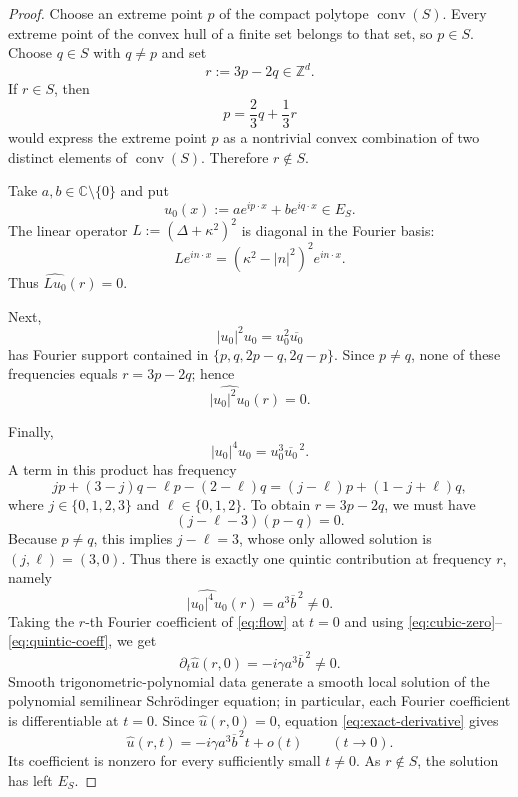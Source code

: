 \documentclass[11pt]{amsart}
\newcommand{\Z}{\mathbb Z}
\newcommand{\C}{\mathbb C}
\newcommand{\conv}{\operatorname{conv}}
\begin{document}
\begin{proof}
Choose an extreme point $p$ of the compact polytope $\conv(S)$.
Every extreme point of the convex hull of a finite set belongs to that set,
so $p\in S$.  Choose $q\in S$ with $q\ne p$ and set
\begin{equation}\label{eq:r}
 r:=3p-2q\in\Z^d.
\end{equation}
If $r\in S$, then
\[
 p=\frac23q+\frac13r
\]
would express the extreme point $p$ as a nontrivial convex combination
of two distinct elements of $\conv(S)$.  Therefore $r\notin S$.

Take $a,b\in\C\setminus\{0\}$ and put
\begin{equation}\label{eq:two-mode}
 u_0(x):=a e^{ip\cdot x}+b e^{iq\cdot x}\in E_S.
\end{equation}
The linear operator $L:=(\Delta+\kappa^2)^2$ is diagonal in the
Fourier basis:
\[
 L e^{in\cdot x}=(\kappa^2-|n|^2)^2e^{in\cdot x}.
\]
Thus $\widehat{Lu_0}(r)=0$.

Next,
\[
 |u_0|^2u_0=u_0^2\overline{u_0}
\]
has Fourier support contained in
$\{p,q,2p-q,2q-p\}$.  Since $p\ne q$, none of these
frequencies equals $r=3p-2q$; hence
\begin{equation}\label{eq:cubic-zero}
 \widehat{|u_0|^2u_0}(r)=0.
\end{equation}

Finally,
\[
 |u_0|^4u_0=u_0^3\overline{u_0}^{\,2}.
\]
A term in this product has frequency
\[
 jp+(3-j)q-\ell p-(2-\ell)q
   =(j-\ell)p+(1-j+\ell)q,
\]
where $j\in\{0,1,2,3\}$ and $\ell\in\{0,1,2\}$.
To obtain $r=3p-2q$, we must have
\[
 (j-\ell-3)(p-q)=0.
\]
Because $p\ne q$, this implies $j-\ell=3$, whose only allowed
solution is $(j,\ell)=(3,0)$.  Thus there is exactly one quintic
contribution at frequency $r$, namely
\begin{equation}\label{eq:quintic-coeff}
 \widehat{|u_0|^4u_0}(r)=a^3\overline b^{\,2}\ne0.
\end{equation}
Taking the $r$-th Fourier coefficient of \eqref{eq:flow} at $t=0$
and using \eqref{eq:cubic-zero}--\eqref{eq:quintic-coeff}, we get
\begin{equation}\label{eq:exact-derivative}
 \partial_t\widehat u(r,0)=-i\gamma a^3\overline b^{\,2}\ne0.
\end{equation}
Smooth trigonometric-polynomial data generate a smooth local solution
of the polynomial semilinear Schr\"odinger equation; in particular,
each Fourier coefficient is differentiable at $t=0$.  Since
$\widehat u(r,0)=0$, equation \eqref{eq:exact-derivative} gives
\[
 \widehat u(r,t)=-i\gamma a^3\overline b^{\,2}t+o(t)
 \qquad (t\to0).
\]
Its coefficient is nonzero for every sufficiently small $t\ne0$.
As $r\notin S$, the solution has left $E_S$.
\end{proof}
\end{document}
